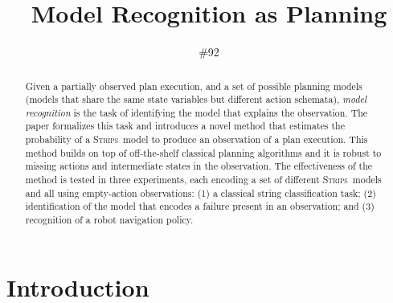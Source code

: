 \documentclass[letterpaper]{article} %
\newcommand{\strips}{\textsc{Strips}}     %
\begin{document}
\title{Model Recognition as Planning}


\author{\#92}


\maketitle
\begin{abstract}
Given a partially observed plan execution, and a set of possible planning models (models that share the same state variables but different action schemata), {\em model recognition} is the task of identifying the model that explains the observation. The paper formalizes this task and introduces a novel method that estimates the probability of a \strips\ model to produce an observation of a plan execution. This method builds on top of off-the-shelf classical planning algorithms and it is robust to missing actions and intermediate states in the observation. The effectiveness of the method is tested in three experiments, each encoding a set of different \strips\ models and all using empty-action observations: (1) a classical string classification task; (2) identification of the model that encodes a failure present in an observation; and (3) recognition of a robot navigation policy.
\end{abstract}

\section{Introduction}
\label{sec:introduction}
\end{document}
